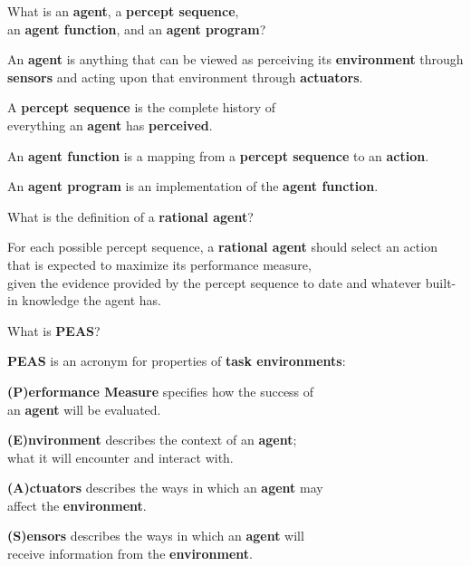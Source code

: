 
\begin{flashcard}[Question]{What is an \textbf{agent}, a \textbf{percept sequence},\\an \textbf{agent function}, and an \textbf{agent program}?}
\begin{center}
An \textbf{agent} is anything that can be viewed as perceiving its \textbf{environment} through \textbf{sensors} and acting upon that environment through \textbf{actuators}.

\medskip

A \textbf{percept sequence} is the complete history of\\everything an \textbf{agent} has \textbf{perceived}.

\medskip

An \textbf{agent function} is a mapping from a \textbf{percept sequence} to an \textbf{action}.

\medskip

An \textbf{agent program} is an implementation of the \textbf{agent function}.
\end{center}
\end{flashcard}

\begin{flashcard}[Question]{What is the definition of a \textbf{rational agent}?}
\begin{center}
For each possible percept sequence, a \textbf{rational agent} should select an action that is expected to maximize its performance measure,\\given the evidence provided by the percept sequence to date and whatever built-in knowledge the agent has.
\end{center}
\end{flashcard}

\begin{flashcard}[Question]{What is \textbf{PEAS}?}
\begin{center}
\textbf{PEAS} is an acronym for properties of \textbf{task environments}:

\medskip

\textbf{(P)erformance Measure} specifies how the success of\\an \textbf{agent} will be evaluated.

\medskip

\textbf{(E)nvironment} describes the context of an \textbf{agent};\\what it will encounter and interact with.

\medskip

\textbf{(A)ctuators} describes the ways in which an \textbf{agent} may\\affect the \textbf{environment}.

\medskip

\textbf{(S)ensors} describes the ways in which an \textbf{agent} will\\receive information from the \textbf{environment}.
\end{center}
\end{flashcard}

